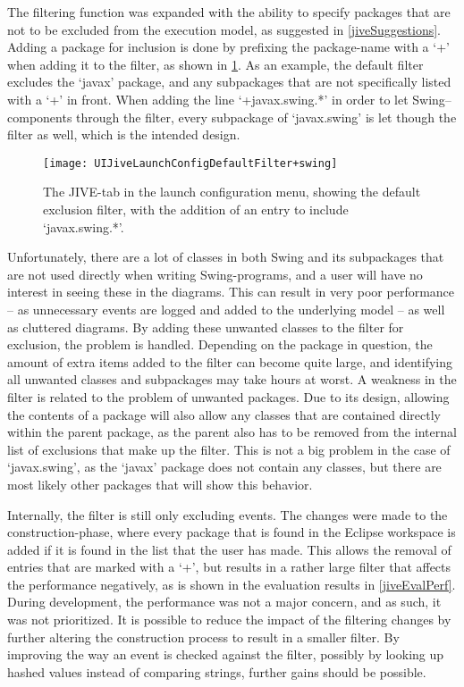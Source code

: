 The filtering function was expanded with the ability to specify packages that are not to be excluded from the execution model, as suggested in \cref{jiveSuggestions}.
Adding a package for inclusion is done by prefixing the package-name with a `+' when adding it to the filter, as shown in \cref{fig:UIJiveLaunchConfigDefaultFilter+swing}.
As an example, the default filter excludes the `javax' package, and any subpackages that are not specifically listed with a `+' in front.
When adding the line `+javax.swing.*' in order to let Swing--components through the filter, every subpackage of `javax.swing' is let though the filter as well, which is the intended design.

\begin{figure}[H]
	\centering
	\texttt{[image: UIJiveLaunchConfigDefaultFilter+swing]}
	\caption[The JIVE-tab in the launch configuration menu.]{The JIVE-tab in the launch configuration menu, showing the default exclusion filter, with the addition of an entry to include `javax.swing.*'.}
	\label{fig:UIJiveLaunchConfigDefaultFilter+swing}
\end{figure}

Unfortunately, there are a lot of classes in both Swing and its subpackages that are not used directly when writing Swing-programs, and a user will have no interest in seeing these in the diagrams.
This can result in very poor performance -- as unnecessary events are logged and added to the underlying model -- as well as cluttered diagrams.
By adding these unwanted classes to the filter for exclusion, the problem is handled.
Depending on the package in question, the amount of extra items added to the filter can become quite large, and identifying all unwanted classes and subpackages may take hours at worst.
A weakness in the filter is related to the problem of unwanted packages.
Due to its design, allowing the contents of a package will also allow any classes that are contained directly within the parent package, as the parent also has to be removed from the internal list of exclusions that make up the filter.
This is not a big problem in the case of `javax.swing', as the `javax' package does not contain any classes, but there are most likely other packages that will show this behavior.

Internally, the filter is still only excluding events.
The changes were made to the construction-phase, where every package that is found in the Eclipse workspace is added if it is found in the list that the user has made.
This allows the removal of entries that are marked with a `+', but results in a rather large filter that affects the performance negatively, as is shown in the evaluation results in \cref{jiveEvalPerf}.
During development, the performance was not a major concern, and as such, it was not prioritized.
It is possible to reduce the impact of the filtering changes by further altering the construction process to result in a smaller filter.
By improving the way an event is checked against the filter, possibly by looking up hashed values instead of comparing strings, further gains should be possible.


